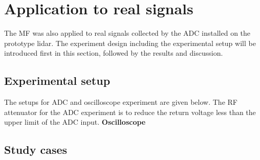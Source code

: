\section{Application to real signals}
The MF was also applied to real signals collected by the ADC installed on the prototype lidar. The experiment design including the experimental setup will be introduced first in this section, followed by the results and discussion.
\subsection{Experimental setup}
The setups for ADC and oscilloscope experiment are given below. The RF attenuator for the ADC experiment is to reduce the return voltage less than the upper limit of the ADC input.
\textbf{Oscilloscope}





\subsection{Study cases}
